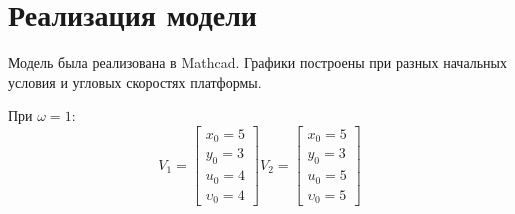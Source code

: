 \documentclass[a4paper, 14pt]{extarticle}
\begin{document}
	\section{Реализация модели}
		Модель была реализована в Mathcad.
		Графики построены при разных начальных условия и угловых скоростях платформы.
		
		При $\omega = 1$:
		\[
			V_1 = \begin{bmatrix}x_0=5\\y_0=3\\u_0=4\\\upsilon_0=4\end{bmatrix}
			V_2 = \begin{bmatrix}x_0=5\\y_0=3\\u_0=5\\\upsilon_0=5\end{bmatrix}
		\]
		
\end{document}
